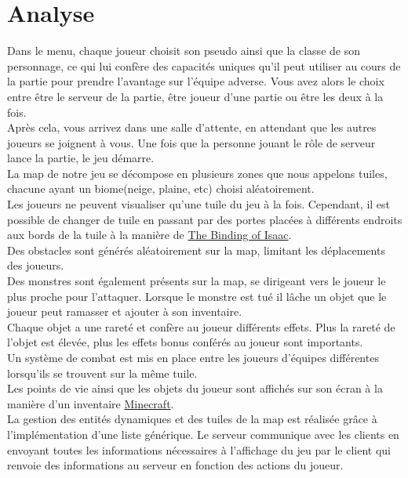 \documentclass[11pt]{article}
\begin{document}
    \section{Analyse}
    Dans le menu, chaque joueur choisit son pseudo ainsi que la classe de son personnage, ce qui lui confère des capacités uniques qu’il peut utiliser au cours de la partie pour prendre l’avantage sur l’équipe adverse.
    Vous avez alors le choix entre être le serveur de la partie, être joueur d’une partie ou être les deux à la fois. \\
    Après cela, vous arrivez dans une salle d’attente, en attendant que les autres joueurs se joignent à vous. Une fois que la personne jouant le rôle de serveur lance la partie, le jeu démarre. \\
    La map de notre jeu se décompose en plusieurs zones que nous appelons tuiles, chacune ayant un biome(neige, plaine, etc) choisi aléatoirement. \\
    Les joueurs ne peuvent visualiser qu’une tuile du jeu à la fois. Cependant, il est possible de changer de tuile en passant par des portes placées à différents endroits 
    aux bords de la tuile à la manière de \href{https://en.wikipedia.org/wiki/The_Binding_of_Isaac_(video_game)}{The Binding of Isaac}. \\
    Des obstacles sont générés aléatoirement sur la map, limitant les déplacements des joueurs. \\
    Des monstres sont également présents sur la map, se dirigeant vers le joueur le plus proche pour l’attaquer. Lorsque le monstre est tué il lâche un objet que le joueur peut
    ramasser et ajouter à son inventaire.\\
    Chaque objet a une rareté et confère au joueur différents effets. Plus la rareté de l’objet est élevée, plus les effets bonus conférés au joueur sont importants. \\
    Un système de combat est mis en place entre les joueurs d’équipes différentes lorsqu’ils se trouvent sur la même tuile. \\
    Les points de vie ainsi que les objets du joueur sont affichés sur son écran à la manière d’un inventaire \href{https://fr.wikipedia.org/wiki/Minecraft}{Minecraft}.\\ 
    La gestion des entités dynamiques et des tuiles de la map est réalisée grâce à l’implémentation d’une liste générique. 
    Le serveur communique avec les clients en envoyant toutes les informations nécessaires à l’affichage du jeu par le client qui renvoie des informations au serveur 
    en fonction des actions du joueur.
    
\end{document}
